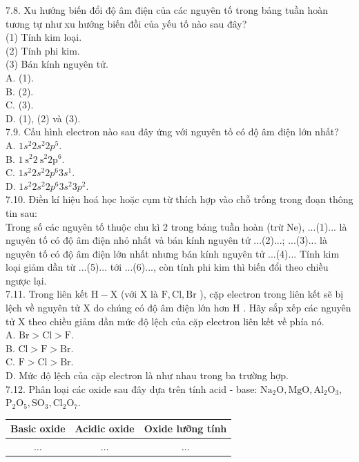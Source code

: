\documentclass[10pt]{article}
\begin{document}
7.8. Xu hướng biến đổi độ âm điện của các nguyên tố trong bảng tuần hoàn tương tự như xu hướng biến đồi của yếu tố nào sau đây?\\
(1) Tính kim loại.\\
(2) Tính phi kim.\\
(3) Bán kính nguyên tử.\\
A. (1).\\
B. (2).\\
C. (3).\\
D. (1), (2) và (3).\\
7.9. Cấu hình electron nào sau đây ứng với nguyên tố có độ âm điện lớn nhất?\\
A. $1 s^{2} 2 s^{2} 2 p^{5}$.\\
B. $1 \mathrm{~s}^{2} 2 \mathrm{~s}^{2} 2 \mathrm{p}^{6}$.\\
C. $1 s^{2} 2 s^{2} 2 p^{6} 3 s^{1}$.\\
D. $1 s^{2} 2 s^{2} 2 p^{6} 3 s^{2} 3 p^{2}$.\\
7.10. Điền kí hiệu hoá học hoặc cụm từ thích hợp vào chỗ trống trong đoạn thông tin sau:\\
Trong số các nguyên tố thuộc chu kì 2 trong bảng tuần hoàn (trừ Ne), ...(1)... là nguyên tố có độ âm điện nhỏ nhất và bán kính nguyên tử ...(2)...; ...(3)... là nguyên tố có độ âm điện lớn nhất nhưng bán kính nguyên tử ...(4)... Tính kim loại giảm dần từ ...(5)... tới ...(6)..., còn tính phi kim thì biến đổi theo chiều ngược lại.\\
7.11. Trong liên kết $\mathrm{H}-\mathrm{X}$ (với X là $\mathrm{F}, \mathrm{Cl}, \mathrm{Br}$ ), cặp electron trong liên kết sẽ bị lệch về nguyên tử X do chúng có độ âm điện lớn hơn H . Hãy sắp xếp các nguyên tử X theo chiều giảm dần mức độ lệch của cặp electron liên kết về phía nó.\\
A. $\mathrm{Br}>\mathrm{Cl}>\mathrm{F}$.\\
B. $\mathrm{Cl}>\mathrm{F}>\mathrm{Br}$.\\
C. $\mathrm{F}>\mathrm{Cl}>\mathrm{Br}$.\\
D. Mức độ lệch của cặp electron là như nhau trong ba trường hợp.\\
7.12. Phân loại các oxide sau đây dựa trên tính acid - base: $\mathrm{Na}_{2} \mathrm{O}, \mathrm{MgO}, \mathrm{Al}_{2} \mathrm{O}_{3}$, $\mathrm{P}_{2} \mathrm{O}_{5}, \mathrm{SO}_{3}, \mathrm{Cl}_{2} \mathrm{O}_{7}$.

\begin{center}
\begin{tabular}{|c|c|c|}
\hline
Basic oxide & Acidic oxide & Oxide lưỡng tính \\
\hline
$\ldots$ & $\ldots$ & $\ldots$ \\
\hline
\end{tabular}
\end{center}
\end{document}
